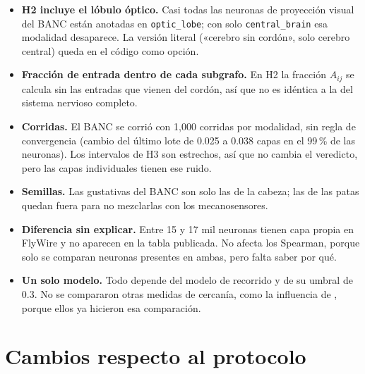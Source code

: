 \documentclass[11pt,letterpaper]{article}
\begin{document}
\begin{itemize}
  \item \textbf{H2 incluye el lóbulo óptico.} Casi todas las neuronas de proyección visual del BANC están anotadas en \texttt{optic\_lobe}; con solo \texttt{central\_brain} esa modalidad desaparece. La versión literal («cerebro sin cordón», solo cerebro central) queda en el código como opción.
  \item \textbf{Fracción de entrada dentro de cada subgrafo.} En H2 la fracción $A_{ij}$ se calcula sin las entradas que vienen del cordón, así que no es idéntica a la del sistema nervioso completo.
  \item \textbf{Corridas.} El BANC se corrió con 1{,}000 corridas por modalidad, sin regla de convergencia (cambio del último lote de 0.025 a 0.038 capas en el 99\,\% de las neuronas). Los intervalos de H3 son estrechos, así que no cambia el veredicto, pero las capas individuales tienen ese ruido.
  \item \textbf{Semillas.} Las gustativas del BANC son solo las de la cabeza; las de las patas quedan fuera para no mezclarlas con los mecanosensores.
  \item \textbf{Diferencia sin explicar.} Entre 15 y 17 mil neuronas tienen capa propia en FlyWire y no aparecen en la tabla publicada. No afecta los Spearman, porque solo se comparan neuronas presentes en ambas, pero falta saber por qué.
  \item \textbf{Un solo modelo.} Todo depende del modelo de recorrido y de su umbral de 0.3. No se compararon otras medidas de cercanía, como la influencia de \citet{bates2026}, porque ellos ya hicieron esa comparación.
\end{itemize}

\section{Cambios respecto al protocolo}
\end{document}
